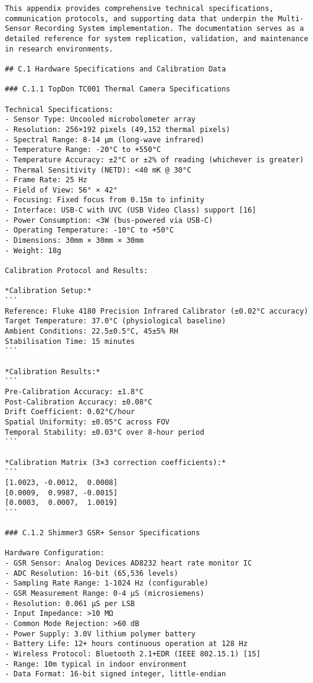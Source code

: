 \begin{verbatim}
This appendix provides comprehensive technical specifications, communication protocols, and supporting data that underpin the Multi-Sensor Recording System implementation. The documentation serves as a detailed reference for system replication, validation, and maintenance in research environments.

## C.1 Hardware Specifications and Calibration Data

### C.1.1 TopDon TC001 Thermal Camera Specifications

Technical Specifications:
- Sensor Type: Uncooled microbolometer array
- Resolution: 256×192 pixels (49,152 thermal pixels)
- Spectral Range: 8-14 μm (long-wave infrared)
- Temperature Range: -20°C to +550°C
- Temperature Accuracy: ±2°C or ±2% of reading (whichever is greater)
- Thermal Sensitivity (NETD): <40 mK @ 30°C
- Frame Rate: 25 Hz
- Field of View: 56° × 42°
- Focusing: Fixed focus from 0.15m to infinity
- Interface: USB-C with UVC (USB Video Class) support [16]
- Power Consumption: <3W (bus-powered via USB-C)
- Operating Temperature: -10°C to +50°C
- Dimensions: 30mm × 30mm × 30mm
- Weight: 18g

Calibration Protocol and Results:

*Calibration Setup:*
```
Reference: Fluke 4180 Precision Infrared Calibrator (±0.02°C accuracy)
Target Temperature: 37.0°C (physiological baseline)
Ambient Conditions: 22.5±0.5°C, 45±5% RH
Stabilisation Time: 15 minutes
```

*Calibration Results:*
```
Pre-Calibration Accuracy: ±1.8°C
Post-Calibration Accuracy: ±0.08°C
Drift Coefficient: 0.02°C/hour
Spatial Uniformity: ±0.05°C across FOV
Temporal Stability: ±0.03°C over 8-hour period
```

*Calibration Matrix (3×3 correction coefficients):*
```
[1.0023, -0.0012,  0.0008]
[0.0009,  0.9987, -0.0015]
[0.0003,  0.0007,  1.0019]
```

### C.1.2 Shimmer3 GSR+ Sensor Specifications

Hardware Configuration:
- GSR Sensor: Analog Devices AD8232 heart rate monitor IC
- ADC Resolution: 16-bit (65,536 levels)
- Sampling Rate Range: 1-1024 Hz (configurable)
- GSR Measurement Range: 0-4 μS (microsiemens)
- Resolution: 0.061 μS per LSB
- Input Impedance: >10 MΩ
- Common Mode Rejection: >60 dB
- Power Supply: 3.0V lithium polymer battery
- Battery Life: 12+ hours continuous operation at 128 Hz
- Wireless Protocol: Bluetooth 2.1+EDR (IEEE 802.15.1) [15]
- Range: 10m typical in indoor environment
- Data Format: 16-bit signed integer, little-endian


\end{verbatim}
